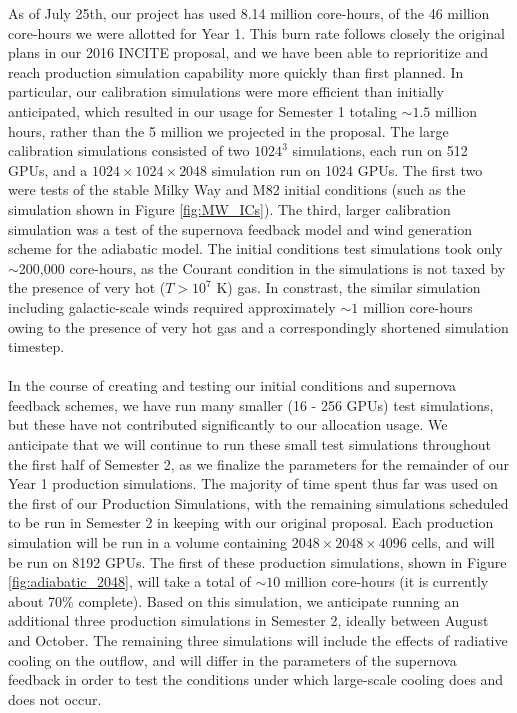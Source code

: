 \documentclass[11pt,letterpaper,english]{article}
\begin{document}
As of July 25th, our project has used 8.14 million core-hours, of the 46 million core-hours we were allotted for Year 1. This burn rate follows closely the original plans in our 2016 INCITE proposal, and we have been
able to reprioritize and reach production simulation capability more quickly than first planned. In particular, our calibration simulations were more efficient than initially anticipated, which resulted in our usage for Semester 1 totaling $\sim1.5$ million hours, rather than the 5 million we projected in the proposal. The large calibration simulations consisted of two $1024^3$ simulations, each run on 512 GPUs, and a $1024\times1024\times2048$ simulation run on 1024 GPUs. The first two were tests of the stable Milky Way and M82 initial conditions (such as the simulation shown in Figure \ref{fig:MW_ICs}). The third, larger calibration simulation was a test of the supernova feedback model and wind generation scheme for the adiabatic model. The initial conditions test simulations took only $\sim$200,000 core-hours, as the Courant condition in the simulations is not
taxed by the presence of very hot ($T > 10^7$ K) gas. In constrast, the similar simulation 
including galactic-scale winds required approximately $\sim1$ million core-hours owing to the 
presence of very hot gas and a correspondingly shortened simulation timestep.
~\\~\\
In the course of creating and testing our initial conditions and supernova feedback schemes, we have run many smaller (16 - 256 GPUs) test simulations, but these have not contributed significantly to our allocation usage. We anticipate that we will continue to run these small test simulations throughout the first half of Semester 2, as we finalize the parameters for the remainder of our Year 1 production simulations. The majority of time spent thus far was used on the first of our Production Simulations, with the remaining simulations scheduled to be run in Semester 2 in keeping with our original proposal. Each production simulation will be run in a volume containing $2048\times2048\times4096$ cells, and will be run on 8192 GPUs. The first of these production simulations, shown in Figure \ref{fig:adiabatic_2048}, will take a total of $\sim10$ million core-hours (it is currently about 70\% complete). Based on this simulation, we anticipate running an additional three production simulations in Semester 2, ideally between August and October. The remaining three simulations will include the effects of radiative cooling on the outflow, and will differ in the parameters of the supernova feedback in order to test the conditions under which large-scale cooling does and does not occur.
\end{document}
